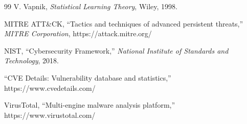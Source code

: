 \documentclass[10pt,conference,a4paper]{IEEEtran}
\begin{document}
\begin{thebibliography}{99}
 V. Vapnik, \textit{Statistical Learning Theory}, Wiley, 1998.

 MITRE ATT\&CK, ``Tactics and techniques of advanced persistent threats,'' \textit{MITRE Corporation}, https://attack.mitre.org/

 NIST, ``Cybersecurity Framework,'' \textit{National Institute of Standards and Technology}, 2018.

 ``CVE Details: Vulnerability database and statistics,'' https://www.cvedetails.com/

 VirusTotal, ``Multi-engine malware analysis platform,'' https://www.virustotal.com/

\end{thebibliography}
\end{document}
